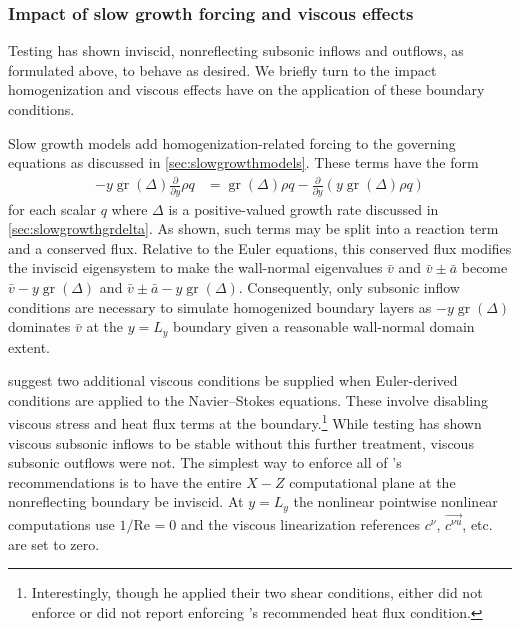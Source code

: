 \documentclass[letterpaper,11pt,nointlimits,reqno,draft]{amsbook}
\newcommand{\Reynolds}[1][]{\ensuremath{\mbox{Re}_{#1}}}
\begin{document}
\subsubsection{Impact of slow growth forcing and viscous effects}

Testing has shown inviscid, nonreflecting subsonic inflows and outflows, as
formulated above, to behave as desired.  We briefly turn to the impact
homogenization and viscous effects have on the application of these boundary
conditions.

Slow growth models add homogenization-related forcing to the governing equations
as discussed in \autoref{sec:slowgrowthmodels}.  These terms have the form
\begin{align}
    -y \operatorname{gr}\!\left(\Delta\right) \frac{\partial}{\partial y} \rho q
    &=
    \operatorname{gr}\!\left(\Delta\right) \rho q
    -
    \frac{\partial}{\partial y}
    \left( y \operatorname{gr}\!\left(\Delta\right) \rho q \right)
\end{align}
for each scalar $q$ where $\Delta$ is a positive-valued growth rate discussed in
\autoref{sec:slowgrowthgrdelta}.  As shown, such terms may be split into a
reaction term and a conserved flux.  Relative to the Euler equations, this
conserved flux modifies the inviscid eigensystem to make the wall-normal
eigenvalues $\bar{v}$ and $\bar{v}\pm\bar{a}$ become $\bar{v} - y
\operatorname{gr}\!\left(\Delta\right)$ and $\bar{v}\pm\bar{a} - y
\operatorname{gr}\!\left(\Delta\right)$.  Consequently, only subsonic inflow
conditions are necessary to simulate homogenized boundary layers as $-y
\operatorname{gr}\!\left(\Delta\right)$ dominates $\bar{v}$ at the $y=L_y$
boundary given a reasonable wall-normal domain extent.

\citet{Poinsot1992Boundary} suggest two additional viscous conditions be
supplied when Euler-derived conditions are applied to the Navier--Stokes
equations.  These involve disabling viscous stress and heat flux terms at the
boundary.\footnote{%
    Interestingly, though he applied their two shear conditions,
    \citet{Guarini1998} either did not enforce or did not report enforcing
    \citeauthor{Poinsot1992Boundary}'s recommended heat flux condition.
}
While testing has shown viscous subsonic inflows to be stable without this
further treatment, viscous subsonic outflows were not.  The simplest way to
enforce all of \citeauthor{Poinsot1992Boundary}'s recommendations is to have the
entire $X-Z$ computational plane at the nonreflecting boundary be inviscid.  At
$y=L_y$ the nonlinear pointwise nonlinear computations use $1/\Reynolds=0$ and
the viscous linearization references $c^\nu$, $\overrightarrow{c^{\nu{}u}}$,
etc. are set to zero.
\end{document}
